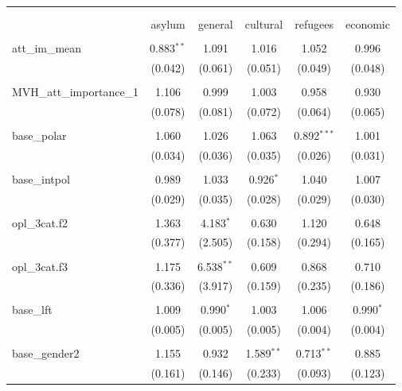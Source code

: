 
\begin{table}[!htbp] \centering 
  \caption{} 
  \label{} 
\begin{tabular}{@{\extracolsep{5pt}}lccccc} 
\\[-1.8ex]\hline 
\hline \\[-1.8ex] 
\\[-1.8ex] & asylum & general & cultural & refugees & economic \\ 
\hline \\[-1.8ex] 
 att\_im\_mean & 0.883$^{**}$ & 1.091 & 1.016 & 1.052 & 0.996 \\ 
  & (0.042) & (0.061) & (0.051) & (0.049) & (0.048) \\ 
  & & & & & \\ 
 MVH\_att\_importance\_1 & 1.106 & 0.999 & 1.003 & 0.958 & 0.930 \\ 
  & (0.078) & (0.081) & (0.072) & (0.064) & (0.065) \\ 
  & & & & & \\ 
 base\_polar & 1.060 & 1.026 & 1.063 & 0.892$^{***}$ & 1.001 \\ 
  & (0.034) & (0.036) & (0.035) & (0.026) & (0.031) \\ 
  & & & & & \\ 
 base\_intpol & 0.989 & 1.033 & 0.926$^{*}$ & 1.040 & 1.007 \\ 
  & (0.029) & (0.035) & (0.028) & (0.029) & (0.030) \\ 
  & & & & & \\ 
 opl\_3cat.f2 & 1.363 & 4.183$^{*}$ & 0.630 & 1.120 & 0.648 \\ 
  & (0.377) & (2.505) & (0.158) & (0.294) & (0.165) \\ 
  & & & & & \\ 
 opl\_3cat.f3 & 1.175 & 6.538$^{**}$ & 0.609 & 0.868 & 0.710 \\ 
  & (0.336) & (3.917) & (0.159) & (0.235) & (0.186) \\ 
  & & & & & \\ 
 base\_lft & 1.009 & 0.990$^{*}$ & 1.003 & 1.006 & 0.990$^{*}$ \\ 
  & (0.005) & (0.005) & (0.005) & (0.004) & (0.004) \\ 
  & & & & & \\ 
 base\_gender2 & 1.155 & 0.932 & 1.589$^{**}$ & 0.713$^{**}$ & 0.885 \\ 
  & (0.161) & (0.146) & (0.233) & (0.093) & (0.123) \\ 

\end{tabular}
\end{table}
